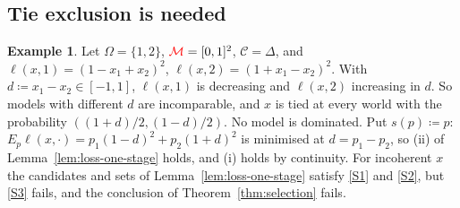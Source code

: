 \documentclass[11pt]{article}
\newcommand{\chg}[1]{{\color{red}#1}}
\theoremstyle{definition}
\newtheorem{example}[theorem]{Example}
\theoremstyle{remark}
\newcommand{\M}{\mathcal M}
\newcommand{\C}{\mathcal C}
\begin{document}
\subsection{Tie exclusion is needed}

\begin{example}\label{ex:ties}
Let $\Omega=\{1,2\}$, $\chg{\M}=[0,1]^2$, $\C=\Delta$, and $\ell(x,1)=(1-x_1+x_2)^2$, $\ell(x,2)=(1+x_1-x_2)^2$. With $d\coloneqq x_1-x_2\in[-1,1]$, $\ell(x,1)$ is decreasing and $\ell(x,2)$ increasing in $d$. So models with different $d$ are incomparable, and $x$ is tied at every world with the probability $((1+d)/2,(1-d)/2)$. No model is dominated. Put $s(p)\coloneqq p$: $E_p\ell(x,\cdot)=p_1(1-d)^2+p_2(1+d)^2$ is minimised at $d=p_1-p_2$, so (ii) of Lemma~\ref{lem:loss-one-stage} holds, and (i) holds by continuity. For incoherent $x$ the candidates and sets of Lemma~\ref{lem:loss-one-stage} satisfy \ref{S1} and \ref{S2}, but \ref{S3} fails, and the conclusion of Theorem~\ref{thm:selection} fails.
\end{example}



\end{document}
